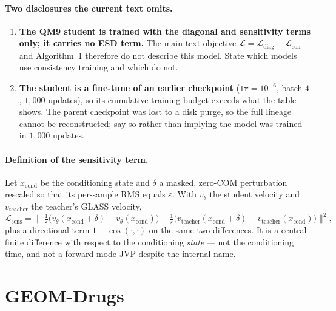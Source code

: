 \documentclass[11pt]{article}
\begin{document}
\paragraph{Two disclosures the current text omits.}
\begin{enumerate}
\item \textbf{The QM9 student is trained with the diagonal and sensitivity terms
only; it carries no ESD term.} The main-text objective
$\mathcal{L}=\mathcal{L}_{\mathrm{diag}}+\mathcal{L}_{\mathrm{con}}$ and
Algorithm~1 therefore do not describe this model. State which models use
consistency training and which do not.
\item \textbf{The student is a fine-tune of an earlier checkpoint}
($\texttt{lr}=10^{-6}$, batch $4$, $1{,}000$ updates), so its cumulative training
budget exceeds what the table shows. The parent checkpoint was lost to a disk
purge, so the full lineage cannot be reconstructed; say so rather than implying
the model was trained in $1{,}000$ updates.
\end{enumerate}

\paragraph{Definition of the sensitivity term.} Let $x_{\mathrm{cond}}$ be the
conditioning state and $\delta$ a masked, zero-COM perturbation rescaled so that
its per-sample RMS equals $\varepsilon$. With $v_\theta$ the student velocity and
$v_{\mathrm{teacher}}$ the teacher's GLASS velocity,
\[
\mathcal{L}_{\mathrm{sens}}
=\Big\|\,
\tfrac{1}{\varepsilon}\big(v_\theta(x_{\mathrm{cond}}{+}\delta)-v_\theta(x_{\mathrm{cond}})\big)
-\tfrac{1}{\varepsilon}\big(v_{\mathrm{teacher}}(x_{\mathrm{cond}}{+}\delta)-v_{\mathrm{teacher}}(x_{\mathrm{cond}})\big)
\Big\|^2 ,
\]
plus a directional term $1-\cos(\cdot,\cdot)$ on the same two differences. It is a
central finite difference with respect to the conditioning \emph{state} --- not the
conditioning time, and not a forward-mode JVP despite the internal name.

\section{GEOM-Drugs}
\end{document}
